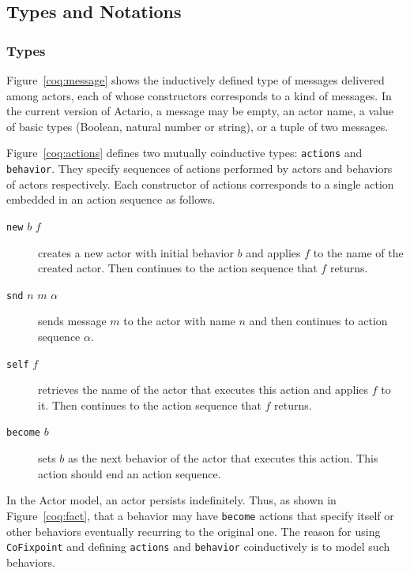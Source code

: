\subsection{Types and Notations}\label{sec:typesandnotations}

\subsubsection{Types}

Figure~\ref{coq:message} shows the inductively defined type of messages delivered
among actors, each of whose constructors corresponds to a kind of
messages.  In the current version of Actario, a message may be empty,
an actor name, a value of basic types (Boolean, natural number or
string), or a tuple of two messages.

Figure~\ref{coq:actions} defines two mutually coinductive types:
\lstinline|actions| and \lstinline|behavior|. They specify sequences
of actions performed by actors and behaviors of actors respectively.
Each constructor of actions corresponds to a single action embedded in
an action sequence as follows.
\begin{description}

\item[\texttt{new} \(b\) \(f\)] creates a new actor with initial
  behavior \(b\) and applies \(f\) to the name of the created
  actor. Then continues to the action sequence that \(f\) returns.

\item[\texttt{snd} \(n\) \(m\) \(\alpha\)] sends message \(m\) to the
  actor with name \(n\) and then continues to action sequence
  \(\alpha\).

\item[\texttt{self} \(f\)] retrieves the name of the actor that executes this
  action and applies \(f\) to it. Then continues to the action sequence
  that \(f\) returns.

\item[\texttt{become} \(b\)] sets \(b\) as the next behavior of the
  actor that executes this action. This action should end an action
  sequence.
\end{description}

In the Actor model, an actor persists indefinitely. Thus, as shown in
Figure~\ref{coq:fact}, that a behavior may have \lstinline|become|
actions that specify itself or other behaviors eventually recurring to
the original one.  The reason for using \lstinline|CoFixpoint| and
defining \lstinline|actions| and \lstinline|behavior| coinductively is
to model such behaviors.


